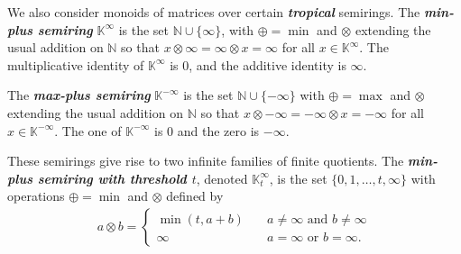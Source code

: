 \documentclass[11pt]{article}
\newcommand{\defn}[1]{\textbf{\textit{#1}}}
\numberwithin{equation}{section}
\newcommand{\N}{\mathbb{N}}
\newcommand{\K}{\mathbb{K}}
\newcommand{\Kmin}{\K^{\infty}}
\newcommand{\Kmint}{\K^{\infty}_t}
\newcommand{\Kmax}{\K^{-\infty}}
\begin{document}
We also consider monoids of matrices over certain \defn{tropical} semirings. 
The \defn{min-plus semiring} $\Kmin$ is the set $\N \cup \{\infty\}$, with
$\oplus = \min$ and $\otimes$ extending the usual addition on $\N$ so that
$x\otimes\infty = \infty\otimes x = \infty$ for all $x \in \Kmin$. The
multiplicative identity of $\Kmin$ is $0$, and the additive identity is
$\infty$.

The \defn{max-plus semiring} $\Kmax$ is the set $\N \cup \{-\infty\}$ with
$\oplus = \max$ and $\otimes$ extending the usual addition on $\N$ so that
$x\otimes-\infty = -\infty\otimes x = -\infty$ for all $x \in \Kmax$. The
one of $\Kmax$ is $0$ and the zero is $-\infty$.

These semirings give rise to two infinite families of finite quotients. The
\defn{min-plus semiring with threshold $t$}, denoted $\Kmint$, is the set $\{0,
  1, \ldots, t, \infty\}$ with operations $\oplus = \min$ and $\otimes$ defined
by
\begin{align*}
  a \otimes b = \begin{cases}
    \min(t, a + b) \quad &\text{$a \neq \infty$ and $b \neq \infty$} \\
    \infty \quad &\text{$a = \infty$ or $b = \infty$}.
  \end{cases}
\end{align*}
\end{document}
